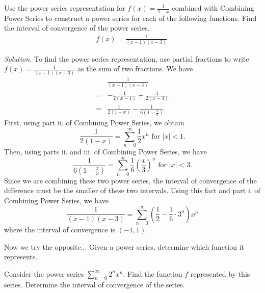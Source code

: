 \documentclass{report}
\begin{document}
    \bigbreak \noindent 
    \begin{exm}
        Use the power series representation for \( f(x) = \frac{1}{1 - x} \) combined with Combining Power Series to construct a power series for each of the following functions. Find the interval of convergence of the power series.
        \begin{align*}
            f(x)  =\frac{1}{(x-1)(x-3)}
        .\end{align*}
    \end{exm}
    \bigbreak \noindent 
    \textit{Solution.}
    To find the power series representation, use partial fractions to write \( f(x) = \frac{1}{(x-1)(x-3)} \) as the sum of two fractions. We have
    \begin{align*}
        &\frac{1}{(x-1)(x-3)}  \\
        =&-\frac{1}{2(x-1)} + \frac{1}{2(x-3)} \\
        =&\frac{1}{2(1-x)} - \frac{1}{6(1-\frac{x}{3})}
    .\end{align*}
    First, using part ii. of Combining Power Series, we obtain
    \[
    \frac{1}{2(1-x)} = \sum_{n=0}^{\infty} \frac{1}{2} x^n \text{ for } |x| < 1.
    \]
    Then, using parts ii. and iii. of Combining Power Series, we have
    \[
    \frac{1}{6(1-\frac{x}{3})} = \sum_{n=0}^{\infty} \frac{1}{6} \left(\frac{x}{3}\right)^n \text{ for } |x| < 3.
    \]
    Since we are combining these two power series, the interval of convergence of the difference must be the smaller of these two intervals. Using this fact and part i. of Combining Power Series, we have
    \[
    \frac{1}{(x-1)(x-3)} = \sum_{n=0}^{\infty} \left(\frac{1}{2} - \frac{1}{6} \cdot 3^n\right) x^n
    \]
    where the interval of convergence is \((-1,1)\).

    \bigbreak \noindent 
    Now we try the opposite... Given a power series, determine which function it represents.
    \bigbreak \noindent 
    \begin{exm}
        Consider the power series \(\sum_{n=0}^{\infty} 2^n x^n\). Find the function \( f \) represented by this series. Determine the interval of convergence of the series.
    \end{exm}

    \bigbreak \noindent 
\end{document}
